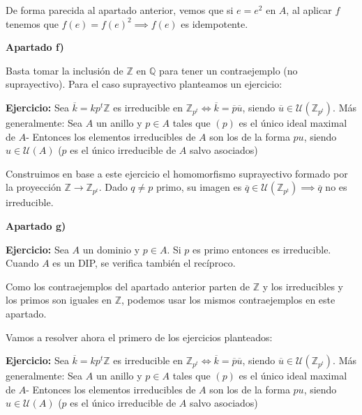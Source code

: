 \documentclass[openany]{book}
\begin{document}
\begin{exercise}
De forma parecida al apartado anterior, vemos que si $ e = e^2  $ en $ A $, al aplicar $ f $ tenemos que $ f(e) = f(e)^2 \implies f(e) $ es idempotente.

\begin{flushright}
    \textbf{Apartado f)}
\end{flushright}

Basta tomar la inclusión de $ \mathbb{Z}  $ en $ \mathbb{Q} $ para tener un contraejemplo (no suprayectivo). Para el caso suprayectivo planteamos un ejercicio:

\textbf{Ejercicio:} Sea $ \overline{k} = kp^{t}\mathbb{Z} $ es irreducible en $ \mathbb{Z}_{p^{t}} \iff \overline{k} = \overline{p} \overline{u}$, siendo $ \overline{u} \in \mathcal{U}(\mathbb{Z}_{p^{t}}) $. Más generalmente: Sea $A $ un anillo y  $ p \in A $ tales que $ (p)  $ es el único ideal maximal de $ A $- Entonces los elementos irreducibles de $ A $ son los de la forma $ pu $, siendo $ u \in \mathcal{U}(A) $ ($ p $ es el único irreducible de $ A $ salvo asociados)

Construimos en base a este ejercicio el homomorfismo suprayectivo formado por la proyección $ \mathbb{Z} \to \mathbb{Z}_{p^{t}} $. Dado $ q \ne p $ primo, su imagen es $ \overline{q} \in \mathcal{U}(\mathbb{Z}_{p^{t}}) \implies \overline{q}  $ no es irreducible.

\begin{flushright}
    \textbf{Apartado g)}
\end{flushright}

\textbf{Ejercicio:} Sea $ A $ un dominio y $ p \in A $. Si $ p $ es primo entonces es irreducible. Cuando $ A $ es un DIP, se verifica también el recíproco.

Como los contraejemplos del apartado anterior parten de $ \mathbb{Z} $ y los irreducibles y los primos son iguales en $ \mathbb{Z} $, podemos usar los mismos contraejemplos en este apartado.

\hrulefill

Vamos a resolver ahora el primero de los ejercicios planteados:

\textbf{Ejercicio:} Sea $ \overline{k} = kp^{t}\mathbb{Z} $ es irreducible en $ \mathbb{Z}_{p^{t}} \iff \overline{k} = \overline{p} \overline{u}$, siendo $ \overline{u} \in \mathcal{U}(\mathbb{Z}_{p^{t}}) $. Más generalmente: Sea $A $ un anillo y  $ p \in A $ tales que $ (p)  $ es el único ideal maximal de $ A $- Entonces los elementos irreducibles de $ A $ son los de la forma $ pu $, siendo $ u \in \mathcal{U}(A) $ ($ p $ es el único irreducible de $ A $ salvo asociados)


\end{exercise}
\end{document}
